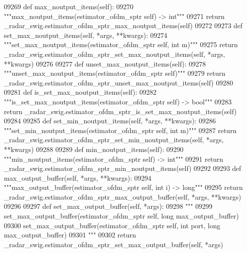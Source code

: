 \begin{DoxyCode}
{{{{{{{{{{{{{{{{{{{{{{{{{{{{{{09269     \textcolor{keyword}{def }max_noutput_items(self):
09270         \textcolor{stringliteral}{"""max\_noutput\_items(estimator\_ofdm\_sptr self) -> int"""}
09271         \textcolor{keywordflow}{return} \_radar\_swig.estimator\_ofdm\_sptr\_max\_noutput\_items(self)
09272 
09273     \textcolor{keyword}{def }set_max_noutput_items(self, *args, **kwargs):
09274         \textcolor{stringliteral}{"""set\_max\_noutput\_items(estimator\_ofdm\_sptr self, int m)"""}
09275         \textcolor{keywordflow}{return} \_radar\_swig.estimator\_ofdm\_sptr\_set\_max\_noutput\_items(self, *args, **kwargs)
09276 
09277     \textcolor{keyword}{def }unset_max_noutput_items(self):
09278         \textcolor{stringliteral}{"""unset\_max\_noutput\_items(estimator\_ofdm\_sptr self)"""}
09279         \textcolor{keywordflow}{return} \_radar\_swig.estimator\_ofdm\_sptr\_unset\_max\_noutput\_items(self)
09280 
09281     \textcolor{keyword}{def }is_set_max_noutput_items(self):
09282         \textcolor{stringliteral}{"""is\_set\_max\_noutput\_items(estimator\_ofdm\_sptr self) -> bool"""}
09283         \textcolor{keywordflow}{return} \_radar\_swig.estimator\_ofdm\_sptr\_is\_set\_max\_noutput\_items(self)
09284 
09285     \textcolor{keyword}{def }set_min_noutput_items(self, *args, **kwargs):
09286         \textcolor{stringliteral}{"""set\_min\_noutput\_items(estimator\_ofdm\_sptr self, int m)"""}
09287         \textcolor{keywordflow}{return} \_radar\_swig.estimator\_ofdm\_sptr\_set\_min\_noutput\_items(self, *args, **kwargs)
09288 
09289     \textcolor{keyword}{def }min_noutput_items(self):
09290         \textcolor{stringliteral}{"""min\_noutput\_items(estimator\_ofdm\_sptr self) -> int"""}
09291         \textcolor{keywordflow}{return} \_radar\_swig.estimator\_ofdm\_sptr\_min\_noutput\_items(self)
09292 
09293     \textcolor{keyword}{def }max_output_buffer(self, *args, **kwargs):
09294         \textcolor{stringliteral}{"""max\_output\_buffer(estimator\_ofdm\_sptr self, int i) -> long"""}
09295         \textcolor{keywordflow}{return} \_radar\_swig.estimator\_ofdm\_sptr\_max\_output\_buffer(self, *args, **kwargs)
09296 
09297     \textcolor{keyword}{def }set_max_output_buffer(self, *args):
09298         \textcolor{stringliteral}{"""}
09299 \textcolor{stringliteral}{        set\_max\_output\_buffer(estimator\_ofdm\_sptr self, long max\_output\_buffer)}
09300 \textcolor{stringliteral}{        set\_max\_output\_buffer(estimator\_ofdm\_sptr self, int port, long max\_output\_buffer)}
09301 \textcolor{stringliteral}{        """}
09302         \textcolor{keywordflow}{return} \_radar\_swig.estimator\_ofdm\_sptr\_set\_max\_output\_buffer(self, *args)
}}}}}}}}}}}}}}}}}}}}}}}}}}}}}}
\end{DoxyCode}
